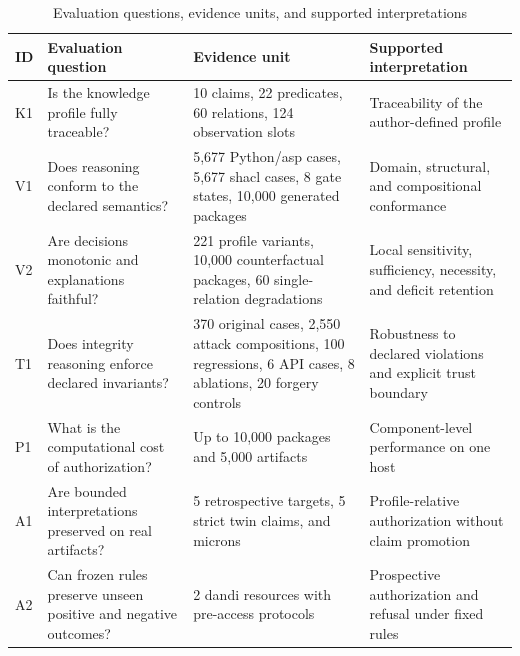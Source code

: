 \documentclass[11pt,a4paper]{article}
\begin{document}
\begin{table}[!htbp]
\centering
\caption{Evaluation questions, evidence units, and supported interpretations}
\label{tab:experiment-design-v2}
\scriptsize
\setlength{\tabcolsep}{3pt}
\renewcommand{\arraystretch}{0.95}

\begin{tabularx}{\textwidth}{
@{}
P{0.05\textwidth}
P{0.25\textwidth}
P{0.31\textwidth}
Y
@{}}
\toprule
ID &
Evaluation question &
Evidence unit &
Supported interpretation \\
\midrule

K1 &
Is the knowledge profile fully traceable?
&
10 claims, 22 predicates, 60 relations, 124 observation slots
&
Traceability of the author-defined profile
\\

V1 &
Does reasoning conform to the declared semantics?
&
5,677 Python/\ac{asp} cases, 5,677 \ac{shacl} cases, 8 gate states, 10,000 generated packages
&
Domain, structural, and compositional conformance
\\

V2 &
Are decisions monotonic and explanations faithful?
&
221 profile variants, 10,000 counterfactual packages, 60 single-relation degradations
&
Local sensitivity, sufficiency, necessity, and deficit retention
\\

T1 &
Does integrity reasoning enforce declared invariants?
&
370 original cases, 2,550 attack compositions, 100 regressions, 6 API cases, 8 ablations, 20 forgery controls
&
Robustness to declared violations and explicit trust boundary
\\

P1 &
What is the computational cost of authorization?
&
Up to 10,000 packages and 5,000 artifacts
&
Component-level performance on one host
\\

A1 &
Are bounded interpretations preserved on real artifacts?
&
5 retrospective targets, 5 strict twin claims, and \ac{microns}
&
Profile-relative authorization without claim promotion
\\

A2 &
Can frozen rules preserve unseen positive and negative outcomes?
&
2 \ac{dandi} resources with pre-access protocols
&
Prospective authorization and refusal under fixed rules
\\

\bottomrule
\end{tabularx}
\end{table}
\end{document}
